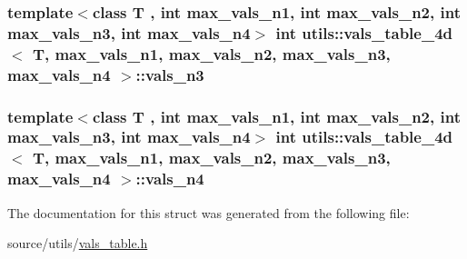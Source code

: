 \hypertarget{structutils_1_1vals__table__4d_a605d04c0b9ec8b6ee58bd8112555bfa0}{
\subsubsection[{vals\-\_\-n3}]{\setlength{\rightskip}{0pt plus 5cm}template$<$class T , int max\-\_\-vals\-\_\-n1, int max\-\_\-vals\-\_\-n2, int max\-\_\-vals\-\_\-n3, int max\-\_\-vals\-\_\-n4$>$ {\bf int} {\bf utils\-::vals\-\_\-table\-\_\-4d}$<$ T, max\-\_\-vals\-\_\-n1, max\-\_\-vals\-\_\-n2, max\-\_\-vals\-\_\-n3, max\-\_\-vals\-\_\-n4 $>$\-::vals\-\_\-n3}}\label{structutils_1_1vals__table__4d_a605d04c0b9ec8b6ee58bd8112555bfa0}
\hypertarget{structutils_1_1vals__table__4d_ac6d1e996ac8b995f53741fa7fef39471}{
\subsubsection[{vals\-\_\-n4}]{\setlength{\rightskip}{0pt plus 5cm}template$<$class T , int max\-\_\-vals\-\_\-n1, int max\-\_\-vals\-\_\-n2, int max\-\_\-vals\-\_\-n3, int max\-\_\-vals\-\_\-n4$>$ {\bf int} {\bf utils\-::vals\-\_\-table\-\_\-4d}$<$ T, max\-\_\-vals\-\_\-n1, max\-\_\-vals\-\_\-n2, max\-\_\-vals\-\_\-n3, max\-\_\-vals\-\_\-n4 $>$\-::vals\-\_\-n4}}\label{structutils_1_1vals__table__4d_ac6d1e996ac8b995f53741fa7fef39471}


The documentation for this struct was generated from the following file\-:\begin{DoxyCompactItemize}
\item 
source/utils/\hyperlink{vals__table_8h}{vals\-\_\-table.\-h}\end{DoxyCompactItemize}
